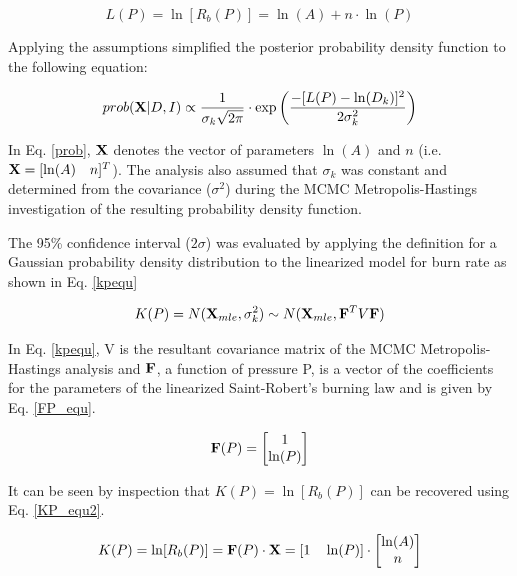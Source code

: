 \documentclass{article}
\begin{document}
\begin{equation} \label{ln_st_rob}
L(P) = \ln [R_b(P)] = \ln (A) + n \cdot \ln (P)
\end{equation}

Applying the assumptions simplified the posterior probability density function to the following equation:

\begin{equation} \label{prob}
prob( \mathbf{X} |D, I) \propto \frac{1}{\sigma_k \sqrt{2 \pi} } \cdot \exp{\bigg( \frac{-[L(P)-\ln(D_k)]^2}{2\sigma_k^2} \bigg)}
\end{equation}

In Eq. \ref{prob}, $\mathbf{X}$ denotes the vector of parameters $\ln(A)$ and $n$ (i.e. $\mathbf{X}=[\ln(A) \quad n]^T$). 
The analysis also assumed that $\sigma_k$ was constant and determined from the covariance ($\sigma^2$) during the MCMC 
Metropolis-Hastings investigation of the resulting probability density function.

The 95\% confidence interval ($2\sigma$) was evaluated by applying the definition for a Gaussian probability density distribution 
to the linearized model for burn rate as shown in Eq. \ref{kpequ}

\begin{equation} \label{kpequ}
K(P)=N(\mathbf{X}_{mle},\sigma_k^2) \sim N(\mathbf{X}_{mle}, \mathbf{F}^T V \mathbf{F})
\end{equation}

In Eq. \ref{kpequ}, V is the resultant covariance matrix of the MCMC Metropolis-Hastings analysis and $\mathbf{F}$, a function of
pressure P, is a vector of the coefficients for the parameters of the linearized Saint-Robert's burning law and is given by
Eq. \ref{FP_equ}.

\begin{equation} \label{FP_equ}
\mathbf{F}(P)= 
\begin{bmatrix}
1 \\ 
\ln(P)
\end{bmatrix}
\end{equation}

It can be seen by inspection that $K(P) = \ln[R_b(P)]$ can be recovered using Eq. \ref{KP_equ2}.

\begin{equation} \label{KP_equ2}
K(P) = \ln[R_b(P)] = \mathbf{F}(P) \cdot \mathbf{X} = [1 \quad \ln(P)] \cdot 
\begin{bmatrix}
\ln(A) \\ 
n
\end{bmatrix}
\end{equation}
\end{document}
